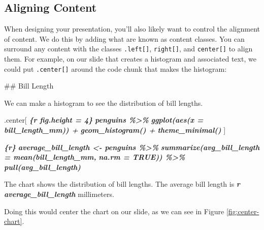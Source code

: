 \documentclass[
]{book}
\newenvironment{Shaded}{\begin{snugshade}}{\end{snugshade}}
\newcommand{\FunctionTok}[1]{\textcolor[rgb]{0.00,0.00,0.00}{#1}}
\newcommand{\InformationTok}[1]{\textcolor[rgb]{0.56,0.35,0.01}{\textbf{\textit{#1}}}}
\newcommand{\NormalTok}[1]{#1}
\begin{document}
\hypertarget{aligning-content}{%
\subsection*{Aligning Content}\label{aligning-content}}

When designing your presentation, you'll also likely want to control the alignment of content. We do this by adding what are known as content classes. You can surround any content with the classes \texttt{.left{[}{]}}, \texttt{right{[}{]}}, and \texttt{center{[}{]}} to align them. For example, on our slide that creates a histogram and associated text, we could put \texttt{.center{[}{]}} around the code chunk that makes the histogram:

\begin{Shaded}
\begin{Highlighting}[]
\FunctionTok{\#\# Bill Length}

\NormalTok{We can make a histogram to see the distribution of bill lengths.}

\NormalTok{.center[}
\InformationTok{\textasciigrave{}\textasciigrave{}\textasciigrave{}\{r fig.height = 4\}}
\InformationTok{penguins \%\textgreater{}\% }
\InformationTok{  ggplot(aes(x = bill\_length\_mm)) +}
\InformationTok{  geom\_histogram() +}
\InformationTok{  theme\_minimal()}
\InformationTok{\textasciigrave{}\textasciigrave{}\textasciigrave{}}
\NormalTok{]}

\InformationTok{\textasciigrave{}\textasciigrave{}\textasciigrave{}\{r\}}
\InformationTok{average\_bill\_length \textless{}{-} penguins \%\textgreater{}\% }
\InformationTok{  summarize(avg\_bill\_length = mean(bill\_length\_mm,}
\InformationTok{                                   na.rm = TRUE)) \%\textgreater{}\% }
\InformationTok{  pull(avg\_bill\_length)}
\InformationTok{\textasciigrave{}\textasciigrave{}\textasciigrave{}}

\NormalTok{The chart shows the distribution of bill lengths. The average bill length is }\InformationTok{\textasciigrave{}r average\_bill\_length\textasciigrave{}}\NormalTok{ millimeters.}
\end{Highlighting}
\end{Shaded}

Doing this would center the chart on our slide, as we can see in Figure \ref{fig:center-chart}.
\end{document}
